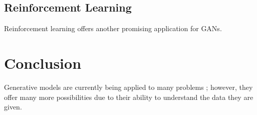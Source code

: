 \documentclass[11pt]{article}
\begin{document}
\subsection{Reinforcement Learning}
Reinforcement learning offers another promising application for GANs.

\section{Conclusion}
Generative models are currently being applied to many problems \citep{genmodelingopenai}; however, they offer many more possibilities due to their ability to understand the data they are given.



\end{document}

